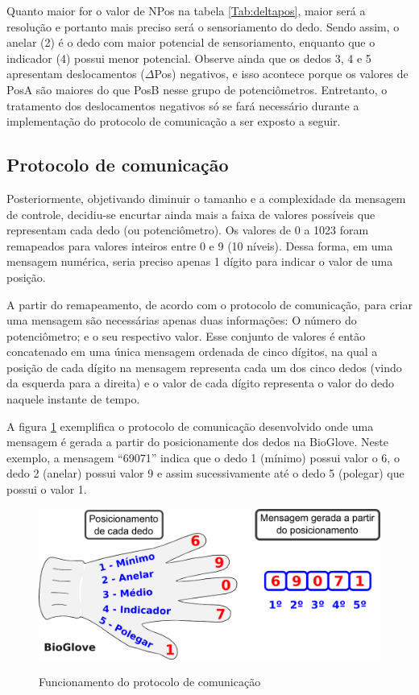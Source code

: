\documentclass[
	12pt,				%
	openright,			%
	oneside,			%
	a4paper,			%
	english,			%
	brazil				%
	]{abntex2}
\begin{document}
		Quanto maior for o valor de NPos na tabela \ref{Tab:deltapos}, maior será a resolução e portanto mais preciso será o sensoriamento do dedo. Sendo assim, o anelar (2) é o dedo com maior potencial de sensoriamento, enquanto que o indicador (4) possui menor potencial. Observe ainda que os dedos 3, 4 e 5 apresentam deslocamentos ($\Delta$Pos) negativos, e isso acontece porque os valores de PosA são maiores do que PosB nesse grupo de potenciômetros. Entretanto, o tratamento dos deslocamentos negativos só se fará necessário durante a implementação do protocolo de comunicação a ser exposto a seguir.


			\subsection{Protocolo de comunicação}

		Posteriormente, objetivando diminuir o tamanho e a complexidade da mensagem de controle, decidiu-se encurtar ainda mais a faixa de valores possíveis que representam cada dedo (ou potenciômetro). Os valores de 0 a 1023 foram remapeados para valores inteiros entre 0 e 9 (10 níveis).	Dessa forma, em uma mensagem numérica, seria preciso apenas 1 dígito para indicar o valor de uma posição. 
		
		A partir do remapeamento, de acordo com o protocolo de comunicação, para criar uma mensagem são necessárias apenas duas informações: O número do potenciômetro; e o seu respectivo valor. Esse conjunto de valores é então concatenado em uma única mensagem ordenada de cinco dígitos, na qual a posição de cada dígito na mensagem representa cada um dos cinco dedos (vindo da esquerda para a direita) e o valor de cada dígito representa o valor do dedo naquele instante de tempo.  
		
		A figura \ref{Fig:glove-create-msg1} exemplifica o protocolo de comunicação desenvolvido onde uma mensagem é gerada a partir do posicionamente dos dedos na BioGlove. Neste exemplo, a mensagem ``69071'' indica que o dedo 1 (mínimo) possui valor o 6, o dedo 2 (anelar) possui valor 9 e assim sucessivamente até o dedo 5 (polegar) que possui o valor 1.


		\begin{figure}[h!]
			\centering
			\caption{Funcionamento do protocolo de comunicação}
  		\includegraphics[width=12cm]{./figures/glove-create-msg1.png}
  		\label{Fig:glove-create-msg1}
		\end{figure}
		
\end{document}
